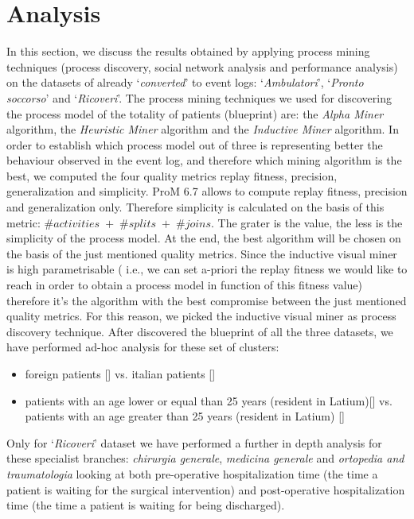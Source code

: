 \section{Analysis} \label{analysis}
In this section, we discuss the results obtained by applying process mining techniques (process discovery, social network analysis and performance analysis) on the datasets of \hospital already `\textit{converted}' to event logs: `\textit{Ambulatori}', `\textit{Pronto soccorso}' and `\textit{Ricoveri}'. The process mining techniques we used for discovering the process model of the totality of patients (blueprint) are: the \textit{Alpha Miner} algorithm, the \textit{Heuristic Miner} algorithm and the \textit{Inductive Miner} algorithm. In order to establish which process model out of three is representing better the behaviour observed in the event log, and therefore which mining algorithm is the best, we computed the four quality metrics replay fitness, precision, generalization and simplicity. ProM 6.7 allows to compute replay fitness, precision and generalization only. Therefore simplicity is calculated on the basis of this metric: \#$activities \;+\;$\#$splits \;+\; $\#$joins$. The grater is the value, the less is the simplicity of the process model. At the end, the best algorithm will be chosen on the basis of the just mentioned quality metrics. Since the inductive visual miner is high parametrisable ( i.e., we can set a-priori the replay fitness we would like to reach in order to obtain a process model in function of this fitness value) therefore it's the algorithm with the best compromise between the just mentioned quality metrics. For this reason, we picked the inductive visual miner as process discovery technique. After discovered the blueprint of all the three datasets, we have performed ad-hoc analysis for these set of clusters:
\begin{itemize}
\item foreign patients [] vs. italian patients []
\item patients with an age lower or equal than 25 years (resident in Latium)[] vs. patients with an age greater than 25 years (resident in Latium) []
\end{itemize}
Only for `\textit{Ricoveri}' dataset we have performed a further in depth analysis for these specialist branches: \textit{chirurgia generale}, \textit{medicina generale} and \textit{ortopedia and traumatologia} looking at both pre-operative hospitalization time (the time a patient is waiting for the surgical intervention) and post-operative hospitalization time (the time a patient is waiting for being discharged).
\clearpage
